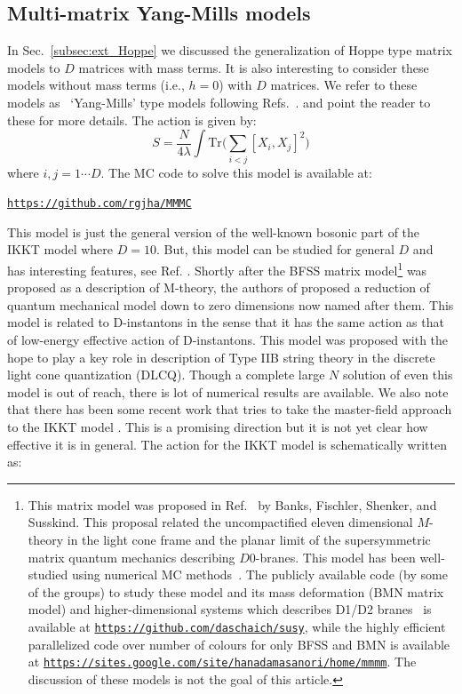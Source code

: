 \documentclass[11pt]{article}
\begin{document}
\subsection{Multi-matrix Yang-Mills models}
In Sec.~\ref{subsec:ext_Hoppe} we discussed the generalization of Hoppe type matrix models to $D$ matrices
with mass terms. It is also interesting to consider these models without mass terms (i.e., $h=0$) with $D$ matrices. 
We refer to these models as ~`Yang-Mills' type models following Refs.~\cite{Krauth:1998yu,Krauth:1999qw}. 
and point the reader to these for more details. The action is given by: 
\begin{equation}
	\label{eq:CTmodel} 
S = \frac{N}{4\lambda} \int \mbox{Tr} \Bigg( \sum_{i < j}[X_i, X_j]^{2}\Bigg) 
\end{equation}
where $i, j = 1 \cdots D$. The MC code to solve this model is available at:
\begin{center} \texttt{\href{https://github.com/rgjha/MMMC}{https://github.com/rgjha/MMMC}} \end{center}
This model is just the general version of the well-known bosonic part of the IKKT model
where $D=10$. But, this model can be studied for general $D$ and has interesting features, see Ref. \cite{Hotta:1998en}. 
Shortly after the BFSS matrix model\footnote{This matrix model was proposed in Ref.~\cite{Banks:1996vh} by
Banks, Fischler, Shenker, and Susskind. This proposal related the 
uncompactified eleven dimensional $M$-theory in the light cone frame and the 
planar limit of the supersymmetric matrix quantum mechanics describing $D0$-branes. This model has been
well-studied using numerical MC methods~\cite{Catterall:2007fp,Hanada:2008ez,Filev:2015hia,Berkowitz:2016tyy}. 
The publicly available code (by some of the groups) to study these model and its mass deformation (BMN matrix model) and higher-dimensional systems which describes D1/D2 branes~\cite{Catterall:2017lub,Jha:2017zad,Catterall:2020nmn}
is available at \texttt{\href{https://github.com/daschaich/susy}{https://github.com/daschaich/susy}}, while the
highly efficient parallelized code over number of colours for only BFSS and BMN is available at
\texttt{\href{https://sites.google.com/site/hanadamasanori/home/mmmm}
{https://sites.google.com/site/hanadamasanori/home/mmmm}}.
The discussion of these models is not the goal of this article. 
}
was proposed as a description of M-theory, the authors of 
\cite{Ishibashi:1996xs} proposed a reduction of quantum mechanical model down to zero 
dimensions now named after them. This model is related to D-instantons 
in the sense that it has the same action as that of low-energy effective action of D-instantons. 
This model was proposed with the hope to play a key role in description of Type IIB string theory in 
the discrete light cone quantization (DLCQ). Though a complete large $N$ solution of even this model 
is out of reach, there is lot of numerical results are available. 
We also note that there has been some recent work that tries to take the master-field approach to the
IKKT model \cite{Klinkhamer:2021wrv}. This is a promising direction but it is not yet clear how effective 
it is in general. The action for the IKKT model is schematically written as:
\end{document}

